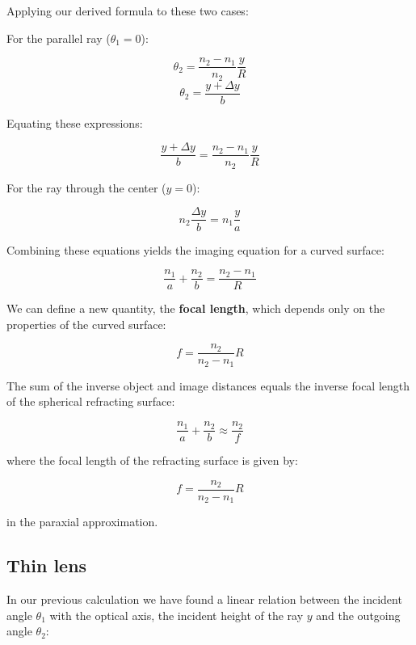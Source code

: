 \documentclass[
  a4paper,
]{book}
\begin{document}
Applying our derived formula to these two cases:

For the parallel ray (\(\theta_1=0\)):

\[\theta_2=\frac{n_2-n_1}{n_2}\frac{y}{R}\]
\[\theta_2=\frac{y+\Delta y}{b}\]

Equating these expressions:

\[\frac{y+\Delta y}{b}=\frac{n_2-n_1}{n_2}\frac{y}{R}\]

For the ray through the center (\(y=0\)):

\[n_2\frac{\Delta y}{b}=n_1\frac{y}{a}\]

Combining these equations yields the imaging equation for a curved
surface:

\[\frac{n_1}{a}+\frac{n_2}{b}=\frac{n_2-n_1}{R}\]

We can define a new quantity, the \textbf{focal length}, which depends
only on the properties of the curved surface:

\[f=\frac{n_2}{n_2-n_1}R\]

\begin{tcolorbox}[enhanced jigsaw, coltitle=black, title=\textcolor{quarto-callout-note-color}{\faInfo}\hspace{0.5em}{Imaging Equation for Spherical Refracting Surface}, colframe=quarto-callout-note-color-frame, toprule=.15mm, opacitybacktitle=0.6, left=2mm, opacityback=0, breakable, toptitle=1mm, bottomtitle=1mm, leftrule=.75mm, arc=.35mm, titlerule=0mm, colbacktitle=quarto-callout-note-color!10!white, rightrule=.15mm, bottomrule=.15mm, colback=white]

The sum of the inverse object and image distances equals the inverse
focal length of the spherical refracting surface:

\[\frac{n_1}{a}+\frac{n_2}{b}\approx\frac{n_2}{f}\]

where the focal length of the refracting surface is given by:

\[f=\frac{n_2}{n_2-n_1}R\]

in the paraxial approximation.

\end{tcolorbox}

\subsection{Thin lens}\label{thin-lens}

In our previous calculation we have found a linear relation between the
incident angle \(\theta_1\) with the optical axis, the incident height
of the ray \(y\) and the outgoing angle \(\theta_2\):
\end{document}
